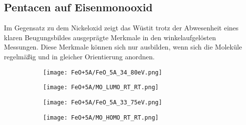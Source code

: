         \FloatBarrier
        \subsection{Pentacen auf Eisenmonooxid}
            Im Gegensatz zu dem Nickeloxid zeigt das Wüstit trotz der Abwesenheit eines klaren Beugungsbildes ausgeprägte Merkmale in den winkelaufgelösten Messungen.
            Diese Merkmale können sich nur ausbilden, wenn sich die Moleküle regelmäßig und in gleicher Orientierung anordnen.
            \begin{figure}
                \centering
                \begin{subfigure}[t]{0.48\textwidth}
                    \centering
                    \texttt{[image: FeO+5A/FeO\_5A\_34\_80eV.png]}
                    \label{fig:MOT_FeO+5A_exp_1}
                \end{subfigure}
                \begin{subfigure}[t]{0.48\textwidth}
                    \centering
                    \texttt{[image: FeO+5A/MO\_LUMO\_RT\_RT.png]}
                    \label{fig:MOT_FeO+5A_theo_1}
                \end{subfigure}
                \centering
                \begin{subfigure}[t]{0.48\textwidth}
                    \centering
                    \texttt{[image: FeO+5A/FeO\_5A\_33\_75eV.png]}
                    \label{fig:MOT_FeO+5A_exp_2}
                \end{subfigure}
                \begin{subfigure}[t]{0.48\textwidth}
                    \centering
                    \texttt{[image: FeO+5A/MO\_HOMO\_RT\_RT.png]}
                    \label{fig:MOT_FeO+5A_theo_2}
                \end{subfigure}

\end{figure}
